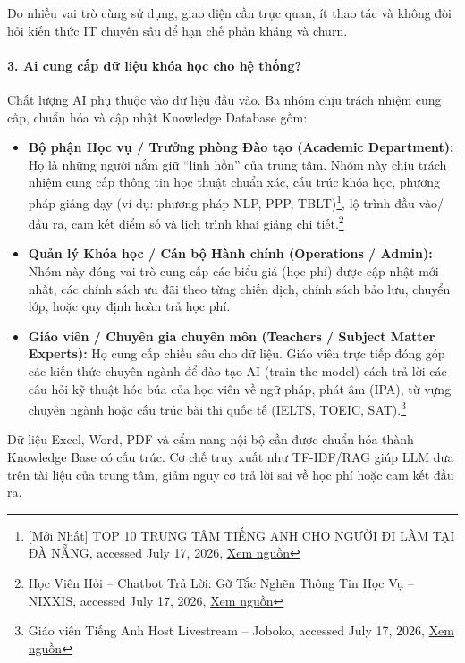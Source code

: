 Do nhiều vai trò cùng sử dụng, giao diện cần trực quan, ít thao tác và không đòi hỏi kiến thức IT chuyên sâu để hạn chế phản kháng và churn.

\paragraph{3. Ai cung cấp dữ liệu khóa học cho hệ thống?}

Chất lượng AI phụ thuộc vào dữ liệu đầu vào. Ba nhóm chịu trách nhiệm cung cấp, chuẩn hóa và cập nhật Knowledge Database gồm:

\begin{itemize}
    \item \textbf{Bộ phận Học vụ / Trưởng phòng Đào tạo (Academic Department):} Họ là những người nắm giữ ``linh hồn'' của trung tâm. Nhóm này chịu trách nhiệm cung cấp thông tin học thuật chuẩn xác, cấu trúc khóa học, phương pháp giảng dạy (ví dụ: phương pháp NLP, PPP, TBLT)\footnote{[Mới Nhất] TOP 10 TRUNG TÂM TIẾNG ANH CHO NGƯỜI ĐI LÀM TẠI ĐÀ NẴNG, accessed July 17, 2026, \href{https://wiseenglish.edu.vn/trung-tam-tieng-anh-cho-nguoi-di-lam}{Xem nguồn}}, lộ trình đầu vào/đầu ra, cam kết điểm số và lịch trình khai giảng chi tiết.\footnote{Học Viên Hỏi -- Chatbot Trả Lời: Gỡ Tắc Nghẽn Thông Tin Học Vụ -- NIXXIS, accessed July 17, 2026, \href{https://nixxis.vn/chatbot-tu-van-hoc-vu-cho-hoc-vien/}{Xem nguồn}}

    \item \textbf{Quản lý Khóa học / Cán bộ Hành chính (Operations / Admin):} Nhóm này đóng vai trò cung cấp các biểu giá (học phí) được cập nhật mới nhất, các chính sách ưu đãi theo từng chiến dịch, chính sách bảo lưu, chuyển lớp, hoặc quy định hoàn trả học phí.

    \item \textbf{Giáo viên / Chuyên gia chuyên môn (Teachers / Subject Matter Experts):} Họ cung cấp chiều sâu cho dữ liệu. Giáo viên trực tiếp đóng góp các kiến thức chuyên ngành để đào tạo AI (train the model) cách trả lời các câu hỏi kỹ thuật hóc búa của học viên về ngữ pháp, phát âm (IPA), từ vựng chuyên ngành hoặc cấu trúc bài thi quốc tế (IELTS, TOEIC, SAT).\footnote{Giáo viên Tiếng Anh Host Livestream -- Joboko, accessed July 17, 2026, \href{https://vn.joboko.com/viec-lam/giao-vien-tieng-anh-host-livestream-xvi6575019?amp=1}{Xem nguồn}}
\end{itemize}

Dữ liệu Excel, Word, PDF và cẩm nang nội bộ cần được chuẩn hóa thành Knowledge Base có cấu trúc. Cơ chế truy xuất như TF-IDF/RAG giúp LLM dựa trên tài liệu của trung tâm, giảm nguy cơ trả lời sai về học phí hoặc cam kết đầu ra.

